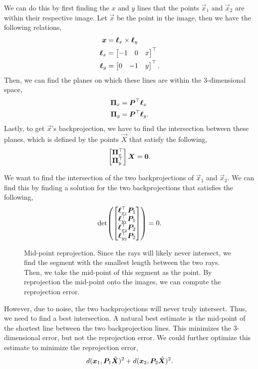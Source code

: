 We can do this by first finding the $x$ and $y$ lines that the points
$\vec{x}_1$ and $\vec{x}_2$ are within their respective image. Let $\vec{x}$ be
the point in the image, then we have the following relations,
\begin{align*}
    \bm{x}      & = \bm{\ell}_x \times \bm{\ell}_y                      \\
    \bm{\ell}_x & = \begin{bmatrix} -1 & 0 & x \end{bmatrix}^\top  \\
    \bm{\ell}_y & = \begin{bmatrix} 0 & -1 & y \end{bmatrix}^\top.
\end{align*}
Then, we can find the planes on which these lines are within the 3-dimensional
space,
\begin{align*}
    \bm{\Pi}_x & = \bm{P}^\top \bm{\ell}_x \\
    \bm{\Pi}_y & = \bm{P}^\top \bm{\ell}_y
    .\end{align*}
Lastly, to get $\vec{x}$'s backprojection, we have to find the intersection
between these planes, which is defined by the points $\vec{X}$ that satisfy the
following, \[
    \begin{bmatrix} \bm{\Pi}_x^\top \\ \bm{\Pi}_y^\top \end{bmatrix} \bm{X} = \bm{0}.
\]

We want to find the intersection of the two backprojections of $\vec{x}_1$ and
$\vec{x}_2$. We can find this by finding a solution for the two
backprojections that satisfies the following, \[
    \det{\begin{bmatrix} \transpose{\vec{\ell}_{x_1}} \mat{P}_1 \\ \transpose{\vec{\ell}_{y_1}} \mat{P}_1 \\ \transpose{\vec{\ell}_{x_2}} \mat{P}_2 \\ \transpose{\vec{\ell}_{y_2}} \mat{P}_2 \end{bmatrix}} = 0.
\]

\begin{figure}[t]
    \centering
    \caption{Mid-point reprojection. Since the rays will likely never intersect, we find the segment with the smallest length between the two rays. Then, we take the mid-point of this segment as the point. By reprojection the mid-point onto the images, we can compute the reprojection error.}
    \label{fig:mid-point-reprojection}
\end{figure}

However, due to noise, the two backprojections will never truly intersect.
Thus, we need to find a best intersection. A natural best estimate is the
mid-point of the shortest line between the two backprojection lines. This
minimizes the 3-dimensional error, but not the reprojection error. We could
further optimize this estimate to minimize the reprojection error, \[
    d(\bm{x}_1, \bm{P}_1 \hat{\bm{X}})^2 + d(\bm{x}_2, \bm{P}_2 \hat{\bm{X}})^2.
\]
